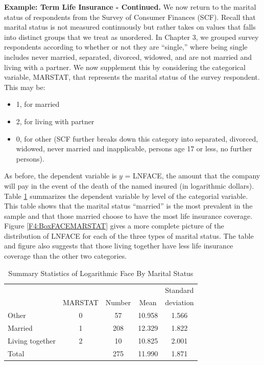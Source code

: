 \textbf{Example: Term Life Insurance - Continued.} We now return to
the marital status of respondents from the Survey of Consumer
Finances (SCF). Recall that marital status is not measured
continuously but rather takes on values that falls into distinct
groups that we treat as unordered. In Chapter 3, we grouped survey
respondents according to whether or not they are ``single,'' where
being single includes never married, separated, divorced, widowed,
and are not married and living with a partner. We now supplement
this by considering the categorical variable, MARSTAT, that
represents the marital status of the survey respondent. This may be:
\bigskip
\begin{itemize}
 \item 1, for married
 \item 2, for living with partner
 \item 0, for other (SCF further breaks down this category into
 separated, divorced, widowed, never married and inapplicable,
 persons age 17 or less, no further persons).
 \end{itemize}
As before, the dependent variable is $y$ = LNFACE, the amount that
the company will pay in the event of the death of the named insured
(in logarithmic dollars). Table \ref{T4:MaritalSumStats} summarizes
the dependent variable by level of the categorial variable. This
table shows that the marital status ``married'' is the most
prevalent in the sample and that those married choose to have the
most life insurance coverage. Figure \ref{F4:BoxFACEMARSTAT} gives a
more complete picture of the distribution of LNFACE for each of the
three types of marital status. The table and figure also suggests
that those living together have less life insurance coverage than
the other two categories.


\begin{table}[h] \caption{\label{T4:MaritalSumStats} Summary
Statistics of Logarithmic Face By Marital Status}
\begin{tabular}{lcccc}
\hline
&  &  &  & Standard \\
& MARSTAT & Number & Mean & deviation\\\hline
Other           & 0 & 57 & 10.958 & 1.566 \\
Married         & 1 & 208 & 12.329 & 1.822 \\
Living together & 2 & 10 & 10.825 & 2.001 \\ \hline
Total           &   & 275 & 11.990 & 1.871 \\
 \hline
\end{tabular}
\end{table}


